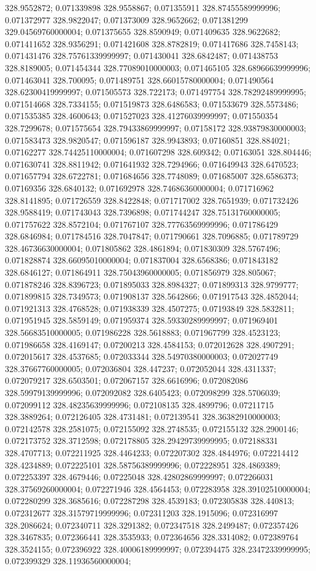 328.9552872; 0.071339898 328.9558867; 0.071355911 328.87455589999996; 0.071372977 328.9822047; 0.071373009 328.9652662; 0.071381299 329.04569760000004; 0.071375655 328.8590949; 0.071409635 328.9622682; 0.071411652 328.9356291; 0.071421608 328.8782819; 0.071417686 328.7458143; 0.071431476 328.75761339999997; 0.071430041 328.6842487; 0.071438753 328.8189005; 0.071454344 328.77089010000003; 0.071465105 328.68966639999996; 0.071463041 328.700095; 0.071489751 328.66015780000004; 0.071490564 328.62300419999997; 0.071505573 328.722173; 0.071497754 328.78292489999995; 0.071514668 328.7334155; 0.071519873 328.6486583; 0.071533679 328.5573486; 0.071535385 328.4600643; 0.071527023 328.41276039999997; 0.071550354 328.7299678; 0.071575654 328.79433869999997; 0.07158172 328.93879830000003; 0.071583473 328.9820547; 0.071596187 328.9943893; 0.07160851 328.884021; 0.07162277 328.74425110000004; 0.071607298 328.609342; 0.07163051 328.804446; 0.071630741 328.8811942; 0.071641932 328.7294966; 0.071649943 328.6470523; 0.071657794 328.6722781; 0.071684656 328.7748089; 0.071685007 328.6586373; 0.07169356 328.6840132; 0.071692978 328.74686360000004; 0.071716962 328.8141895; 0.071726559 328.8422848; 0.071717002 328.7651939; 0.071732426 328.9588419; 0.071743043 328.7396898; 0.071744247 328.75131760000005; 0.071757622 328.8572104; 0.071767107 328.77763569999996; 0.071786429 328.6846984; 0.071784516 328.7047847; 0.071790661 328.7096885; 0.071789729 328.46736630000004; 0.071805862 328.4861894; 0.071830309 328.5767496; 0.071828874 328.66095010000004; 0.071837004 328.6568386; 0.071843182 328.6846127; 0.071864911 328.75043960000005; 0.071856979 328.805067; 0.071878246 328.8396723; 0.071895033 328.8984327; 0.071899313 328.9799777; 0.071899815 328.7349573; 0.071908137 328.5642866; 0.071917543 328.4852044; 0.071921313 328.4768528; 0.071938339 328.4507275; 0.07193849 328.5832811; 0.071951945 328.5859149; 0.071959374 328.59330289999997; 0.071969401 328.56683510000005; 0.071986228 328.5618883; 0.071967799 328.4523123; 0.071986658 328.4169147; 0.07200213 328.4584153; 0.072012628 328.4907291; 0.072015617 328.4537685; 0.072033344 328.54970380000003; 0.072027749 328.37667760000005; 0.072036804 328.447237; 0.072052044 328.4311337; 0.072079217 328.6503501; 0.072067157 328.6616996; 0.072082086 328.59979139999996; 0.072092082 328.6405423; 0.072098299 328.5706039; 0.072099112 328.48235639999996; 0.072108135 328.4899796; 0.07211715 328.3889264; 0.072126405 328.4731481; 0.072139541 328.36382910000003; 0.072142578 328.2581075; 0.072155092 328.2748535; 0.072155132 328.2900146; 0.072173752 328.3712598; 0.072178805 328.29429739999995; 0.072188331 328.4707713; 0.072211925 328.4464233; 0.072207302 328.4844976; 0.072214412 328.4234889; 0.072225101 328.58756389999996; 0.072228951 328.4869389; 0.072253397 328.4679446; 0.07225048 328.42802869999997; 0.072266031 328.37569260000004; 0.072271946 328.4564453; 0.072283958 328.39102510000004; 0.072280299 328.3685616; 0.072287298 328.4539183; 0.072305838 328.440813; 0.072312677 328.31579719999996; 0.072311203 328.1915096; 0.072316997 328.2086624; 0.072340711 328.3291382; 0.072347518 328.2499487; 0.072357426 328.3467835; 0.072366441 328.3535933; 0.072364656 328.3314082; 0.072389764 328.3524155; 0.072396922 328.40006189999997; 0.072394475 328.23472339999995; 0.072399329 328.11936560000004; 